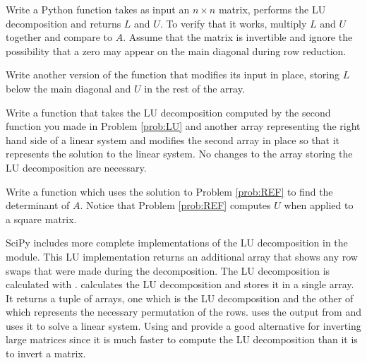 \begin{problem}
\label{prob:LU}
Write a Python function takes as input an $n\times n$ matrix, performs the LU decomposition and returns $L$ and $U$.
To verify that it works, multiply $L$ and $U$ together and compare to $A$.
Assume that the matrix is invertible and ignore the possibility that a zero may appear on the main diagonal during row reduction.

Write another version of the function that modifies its input in place, storing $L$ below the main diagonal and $U$ in the rest of the array.
\end{problem}

\begin{problem}
Write a function that takes the LU decomposition computed by the second function you made in Problem \ref{prob:LU} and another array representing the right hand side of a linear system and modifies the second array in place so that it represents the solution to the linear system.
No changes to the array storing the LU decomposition are necessary.
\end{problem}

\begin{problem}
\label{prob:det}
Write a function which uses the solution to Problem \ref{prob:REF} to find the determinant of $A$.
Notice that Problem \ref{prob:REF} computes $U$ when applied to a square matrix.
\end{problem}

SciPy includes more complete implementations of the LU decomposition in the  module.  This LU implementation returns an additional array that shows any row swaps that were made during the decomposition.
The LU decomposition is calculated with .
 calculates the LU decomposition and stores it in a single array.
It returns a tuple of arrays, one which is the LU decomposition and the other of which represents the necessary permutation of the rows.
 uses the output from  and uses it to solve a linear system.
Using  and  provide a good alternative for inverting large matrices since it is much faster to compute the LU decomposition than it is to invert a matrix.

